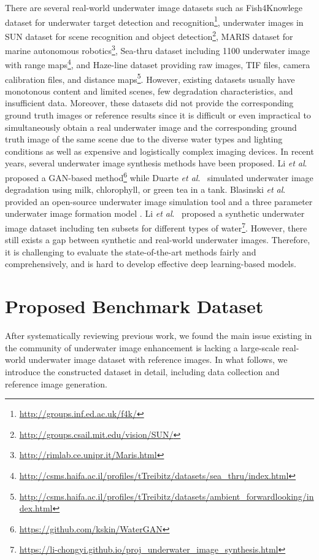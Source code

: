 \documentclass[journal]{IEEEtran}
\newcommand{\etal}{\textit{et al}.}
\begin{document}
There are several real-world underwater image datasets such as Fish4Knowlege dataset for underwater target detection and recognition\footnote[1]{\url{http://groups.inf.ed.ac.uk/f4k/}}, underwater images in SUN dataset for scene recognition and object detection\footnote[2]{\url{http://groups.csail.mit.edu/vision/SUN/}}\cite{SUN}, MARIS dataset for marine autonomous robotics\footnote[3]{\url{http://rimlab.ce.unipr.it/Maris.html}}, Sea-thru dataset including 1100 underwater image with range maps\footnote[4]{\url{http://csms.haifa.ac.il/profiles/tTreibitz/datasets/sea_thru/index.html}}\cite{Akkaynak2019}, and Haze-line dataset providing raw images, TIF files, camera calibration files, and distance maps\footnote[5]{\url{http://csms.haifa.ac.il/profiles/tTreibitz/datasets/ambient_forwardlooking/index.html}}\cite{BermanData}.
However, existing datasets usually have monotonous content and limited scenes, few degradation characteristics, and insufficient data. Moreover, these datasets did not provide the corresponding ground truth images or reference results since it is difficult or even impractical to simultaneously obtain a real underwater image and the corresponding ground truth image of the same scene due to the diverse water types and lighting conditions as well as expensive and logistically complex imaging devices. In recent years, several underwater image synthesis methods have been proposed. Li \etal~\cite{WaterGAN} proposed a GAN-based method\footnote[6]{\url{https://github.com/kskin/WaterGAN}} while Duarte \etal~\cite{Duarte2016} simulated underwater image degradation using milk, chlorophyll, or green tea in a tank.
Blasinski \etal~\cite{Blasinski2017} provided an open-source underwater image simulation tool and a three parameter underwater image formation model \cite{Blasinski2016}. Li \etal~\cite{UWCNN} proposed a synthetic underwater image dataset including ten subsets for different types of water\footnote[7]{\url{https://li-chongyi.github.io/proj_underwater_image_synthesis.html}}. However, there still exists a gap between synthetic and real-world underwater images. Therefore, it is challenging to evaluate the state-of-the-art methods fairly and comprehensively, and is hard to develop effective deep learning-based models.




\section{Proposed Benchmark Dataset}

After systematically reviewing previous work, we found the main issue existing in the community of underwater image enhancement is lacking a large-scale real-world underwater image dataset with reference images. In what follows, we introduce the constructed dataset in detail, including data collection and reference image generation.
\end{document}

